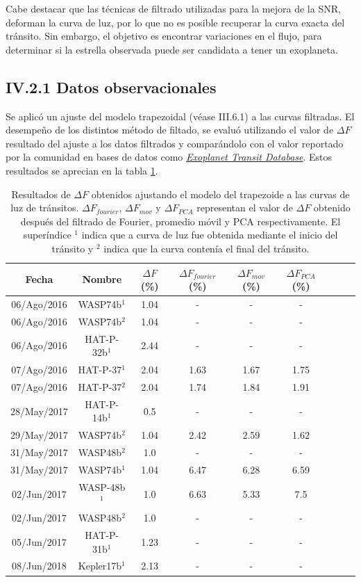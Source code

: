 Cabe destacar que las técnicas de filtrado utilizadas para la mejora de la SNR, deforman la curva de luz, por lo que no es posible recuperar la curva exacta del tránsito. Sin embargo, el objetivo es encontrar variaciones en el flujo, para determinar si la estrella observada puede ser candidata a tener un exoplaneta.

\subsection*{IV.2.1 Datos observacionales}

Se aplicó un ajuste del modelo trapezoidal (véase III.6.1) a las curvas filtradas. El desempeño de los distintos método de filtado, se evaluó utilizando el valor de $\Delta F$ resultado del ajuste a los datos filtrados y comparándolo con el valor reportado por la comunidad en bases de datos como \href{http://var2.astro.cz/ETD/index.php}{\textit{Exoplanet Transit Database}}. Estos resultados se aprecian en la tabla \ref{tab_4_4_resultados_profundidad}.


\begin{table}
	\centering
	\begin{tabular}{ccccccccc}
	\hline 
	Fecha & Nombre & $\Delta F$ (\%) & $\Delta F_{fourier}$ (\%) &  $\Delta F_{mov}$ (\%) & $\Delta F_{PCA}$ (\%) \\ 
	\hline
	06/Ago/2016 & WASP74b$^{1}$ & 1.04 & - & - & - \\ 
	06/Ago/2016 & WASP74b$^{2}$ & 1.04 & - & - & - \\
	06/Ago/2016 & HAT-P-32b$^{1}$ & 2.44 & - & - & - \\
	07/Ago/2016 & HAT-P-37$^{1}$ & 2.04 & 1.63 & 1.67 & 1.75 \\ 
	07/Ago/2016 & HAT-P-37$^{2}$ & 2.04 & 1.74 & 1.84 & 1.91 \\ 
	28/May/2017 & HAT-P-14b$^{1}$ & 0.5 & - & - & - \\ 
	29/May/2017 & WASP74b$^{2}$ & 1.04 & 2.42 & 2.59 & 1.62 \\ 
	31/May/2017 & WASP48b$^{2}$ & 1.0 & - & - & - \\  
	31/May/2017 & WASP74b$^{1}$ & 1.04 & 6.47 & 6.28 & 6.59 \\
	02/Jun/2017 & WASP-48b$^{1}$ & 1.0 & 6.63 & 5.33 & 7.5 \\
	02/Jun/2017 & WASP48b$^{2}$ & 1.0 & - & - & - \\
	05/Jun/2017 & HAT-P-31b$^{1}$ & 1.23 & - & - & - \\
	08/Jun/2018 & Kepler17b$^{1}$ & 2.13 & - & - & - \\ 
	\hline 
	\end{tabular} 
	\caption{Resultados de $\Delta F$ obtenidos ajustando el modelo del trapezoide a las curvas de luz de tránsitos. $\Delta F_{fourier}$, $\Delta F_{mov}$ y $\Delta F_{PCA}$ representan el valor de $\Delta F$ obtenido después del filtrado de Fourier, promedio móvil y PCA respectivamente. El superíndice $^{1}$ indica que a curva de luz fue obtenida mediante el inicio del tránsito y $^{2}$ indica que la curva contenía el final del tránsito.}
	\label{tab_4_4_resultados_profundidad}
	\end{table}

